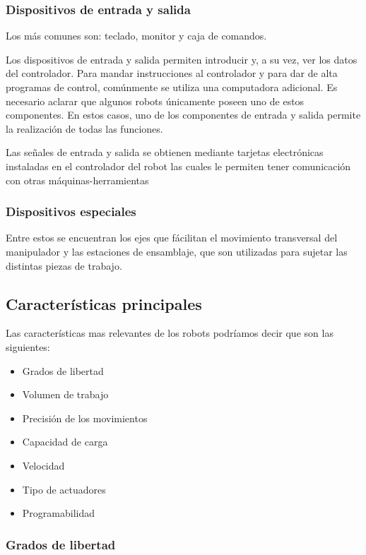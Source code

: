 \documentclass[12pt,a4paper]{report}
\begin{document}
\subsubsection{Dispositivos de entrada y salida}
Los más comunes son: teclado, monitor y caja de comandos.

Los dispositivos de entrada y salida permiten introducir y, a su vez, ver los
datos del controlador. Para mandar instrucciones al controlador y para dar de
alta programas de control, comúnmente se utiliza una computadora adicional. Es
necesario aclarar que algunos robots únicamente poseen uno de estos componentes.
En estos casos, uno de los componentes de entrada y salida permite la
realización de todas las funciones.

Las señales de entrada y salida se obtienen mediante tarjetas electrónicas
instaladas en el controlador del robot las cuales le permiten tener comunicación
con otras máquinas-herramientas


\subsubsection{Dispositivos especiales}
Entre estos se encuentran los ejes que fácilitan el movimiento transversal del
manipulador y las estaciones de ensamblaje, que son utilizadas para sujetar las
distintas piezas de trabajo.



\subsection{Características principales}

Las características mas relevantes de los robots podríamos decir que son las
siguientes:

\begin{itemize}
    \item Grados de libertad
    \item Volumen de trabajo
    \item Precisión de los movimientos
    \item Capacidad de carga
    \item Velocidad
    \item Tipo de actuadores
    \item Programabilidad
\end{itemize}
 

    
\subsubsection{Grados de libertad}
\end{document}
